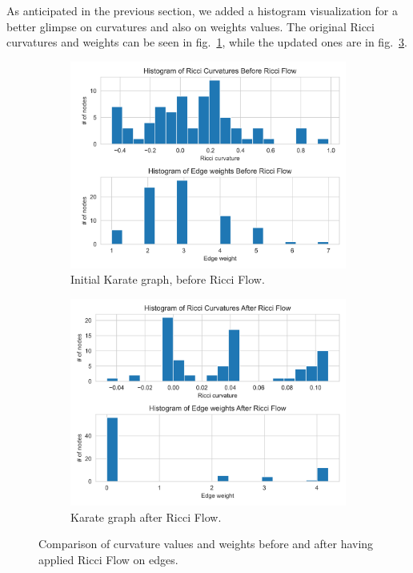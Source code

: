 As anticipated in the previous section, we added a histogram visualization for a better glimpse on curvatures and also on weights values. The original Ricci curvatures and weights can be seen in fig.~\ref{fig:Karate_comparison_histo_a}, while the updated ones are in fig.~\ref{fig:Karate_comparison_histo_b}.
\begin{figure}
    \centering
    \begin{subfigure}{0.45\textwidth}
        \centering
        \includegraphics[width=\textwidth]{../KarateClubResults/Before Ricci Flow.png}
        \caption{Initial Karate graph, before Ricci Flow.}
        \label{fig:Karate_comparison_histo_a}
    \end{subfigure}
    \hfill
    \begin{subfigure}{0.45\textwidth}
        \centering
        \includegraphics[width=\textwidth]{../KarateClubResults/After Ricci Flow.png}
        \caption{Karate graph after Ricci Flow.}
        \label{fig:Karate_comparison_histo_b}
    \end{subfigure}
    \caption{Comparison of curvature values and weights before and after having applied Ricci Flow on edges.}
\end{figure}

